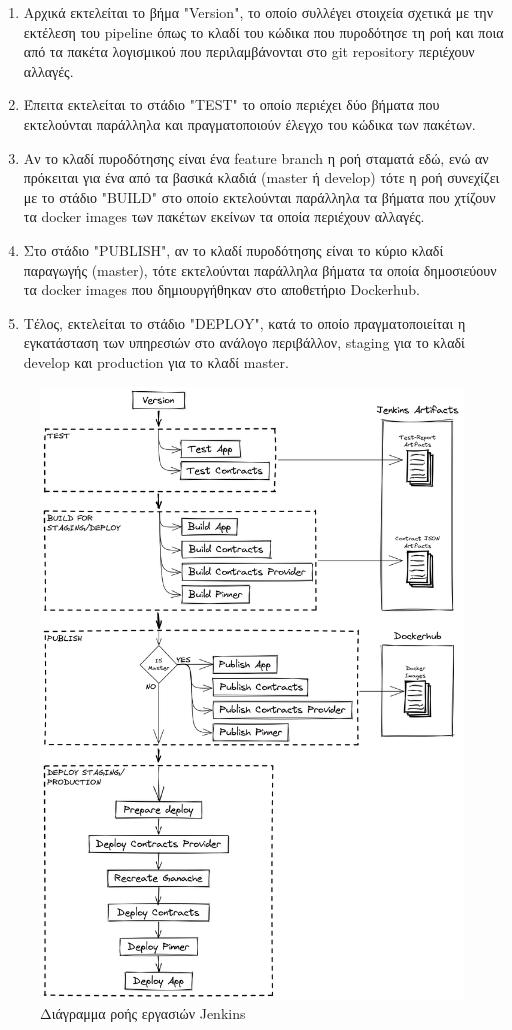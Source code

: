 \begin{enumerate}
    \item Αρχικά εκτελείται το βήμα "Version", το οποίο συλλέγει στοιχεία σχετικά με την εκτέλεση του pipeline όπως το κλαδί του κώδικα που πυροδότησε τη ροή και ποια από τα πακέτα λογισμικού που περιλαμβάνονται στο git repository περιέχουν αλλαγές.
    \item Έπειτα εκτελείται το στάδιο "TEST" το οποίο περιέχει δύο βήματα που εκτελούνται παράλληλα και πραγματοποιούν έλεγχο του κώδικα των πακέτων.
    \item Αν το κλαδί πυροδότησης είναι ένα feature branch η ροή σταματά εδώ, ενώ αν πρόκειται για ένα από τα βασικά κλαδιά (master ή develop) τότε η ροή συνεχίζει με το στάδιο "BUILD" στο οποίο εκτελούνται παράλληλα τα βήματα που χτίζουν τα docker images των πακέτων εκείνων τα οποία περιέχουν αλλαγές.
    \item Στο στάδιο "PUBLISH", αν το κλαδί πυροδότησης είναι το κύριο κλαδί παραγωγής (master), τότε εκτελούνται παράλληλα βήματα τα οποία δημοσιεύουν τα docker images που δημιουργήθηκαν στο αποθετήριο Dockerhub.
    \item Τέλος, εκτελείται το στάδιο "DEPLOY", κατά το οποίο πραγματοποιείται η εγκατάσταση των υπηρεσιών στο ανάλογο περιβάλλον, staging για το κλαδί develop και production για το κλαδί master.
\end{enumerate}

\begin{figure}[H]
    \centering
    \includegraphics[width=.8\textwidth]{assets/figures/chapter-4/4.1.implementation-methodology-jenkins-pipeline.png}
    \caption{Διάγραμμα ροής εργασιών Jenkins}
    \label{figure:4.1.implementation-methodology-jenkins-pipeline}
\end{figure}

